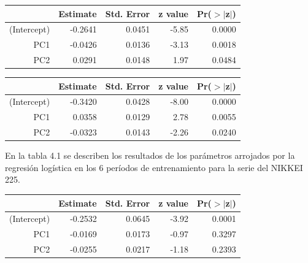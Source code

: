 \documentclass[a4paper,12pt]{Latex/Classes/PhDthesisPSnPDF}
\begin{document}
\newpage
\begin{center}
\begin{table}[ht]
\centering
\begin{tabular}{rrrrr}
  \hline
 & Estimate & Std. Error & z value & Pr($>$$|$z$|$) \\ 
  \hline
(Intercept) & -0.2641 & 0.0451 & -5.85 & 0.0000 \\ 
  PC1 & -0.0426 & 0.0136 & -3.13 & 0.0018 \\ 
  PC2 & 0.0291 & 0.0148 & 1.97 & 0.0484 \\ 
   \hline
\end{tabular}
\end{table}\end{center}
\begin{center}
\begin{table}[ht]
\centering
\begin{tabular}{rrrrr}
  \hline
 & Estimate & Std. Error & z value & Pr($>$$|$z$|$) \\ 
  \hline
(Intercept) & -0.3420 & 0.0428 & -8.00 & 0.0000 \\ 
  PC1 & 0.0358 & 0.0129 & 2.78 & 0.0055 \\ 
  PC2 & -0.0323 & 0.0143 & -2.26 & 0.0240 \\ 
   \hline
\end{tabular}
\end{table}\end{center}


En la tabla 4.1 se describen los resultados de los parámetros arrojados por la regresión logística en los 6 períodos de entrenamiento para la serie del NIKKEI 225.
\begin{center}
\begin{table}[ht]
\centering
\begin{tabular}{rrrrr}
  \hline
 & Estimate & Std. Error & z value & Pr($>$$|$z$|$) \\ 
  \hline
(Intercept) & -0.2532 & 0.0645 & -3.92 & 0.0001 \\ 
  PC1 & -0.0169 & 0.0173 & -0.97 & 0.3297 \\ 
  PC2 & -0.0255 & 0.0217 & -1.18 & 0.2393 \\ 
   \hline
\end{tabular}
\end{table}\end{center}
\end{document}
